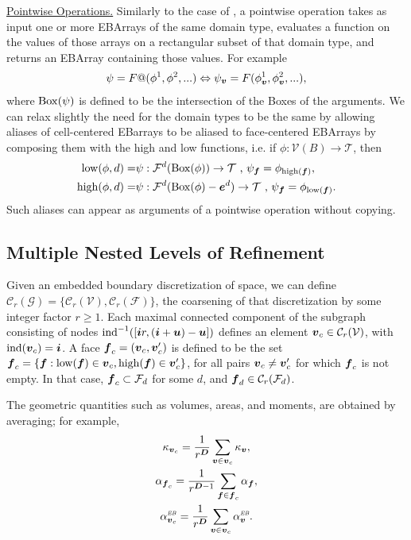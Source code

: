 \documentclass[12pt]{article}
\newcommand{\mcl}[1]{{\mathcal{#1}}}
\newcommand{\ind}{{\rm{ind}}}
\newcommand{\low}{{\rm{low}}}
\newcommand{\high}{{\rm{high}}}
\newcommand{\MBox}{{\rm{Box}}}
\newcommand{\vof}{{\mbf{v}}}
\newcommand{\face}{{\mbf{f}}}
\newcommand{\VC}{{\mcl{C}_r(\mcl{V})}}
\newcommand{\ebsub}{{\text{\it \tiny EB}}}
\begin{document}
\noindent
\underline{Pointwise Operations.} Similarly to the case of , a pointwise operation takes as input one or more EBArrays of the same domain type, evaluates a function on the values of those arrays on a rectangular subset of that domain type, and returns an EBArray containing those values. For example
\begin{gather*}
\psi = F@(\phi^{1},\phi^2, ...) \Leftrightarrow \psi_{\vof} = F(\phi_\vof^1,\phi_\vof^2, ...),
\end{gather*}
where $\MBox(\psi)$ is defined to be the intersection of the Boxes of the arguments.
We can relax slightly the need for the domain types to be the same by allowing aliases of cell-centered EBarrays to be aliased to face-centered EBArrays by composing them with the high and low functions, i.e. if $\phi:\mcl{V}(B) \rightarrow \mcl{T}$, then
\begin{align*}
\low(\phi,d) = & \psi:\mcl{F}^d(\MBox(\phi)) \rightarrow \mcl{T} \cma \psi_\face = \phi_{\high(\face)}, \\ 
\high(\phi,d) = & \psi:\mcl{F}^d(\MBox(\phi)- \mbf{e}^d) \rightarrow \mcl{T} \cma \psi_\face = \phi_{\low(\face)}.
\end{align*}
Such aliases can appear as arguments of a pointwise operation without copying.

\subsection{Multiple Nested Levels of Refinement} 

Given an embedded boundary discretization of space, we can define $\mcl{C}_r(\mcl{G}) =\{ \mcl{C}_r(\mcl{V}),\mcl{C}_r(\mcl{F})\}$, the coarsening of that discretization by some integer factor $r \ge 1$. Each maximal connected component of the subgraph consisting of nodes $\ind^{-1}([\mbf{i} r , (\mbf{i} + \mbf{u}) - \mbf{u}] )$ defines an element $\vof_c \in \VC$, with $\ind(\vof_c) = \mbf{i}$. A face $\face_c = (\vof_c , \vof_c')$ is defined to be the set $\face_c = \{\face: \low(\face ) \in \vof_c , \high(\face) \in \vof_c'\}$, for all pairs $\vof_c \neq \vof_c'$ for which $\face_c$ is not empty. In that case, $\face_c \subset \mcl{F}_d$ for some $d$, and $\face_d \in \mcl{C}_r(\mcl{F}_d)$.

The geometric quantities such as volumes, areas, and moments, are obtained by averaging; for example,
\begin{gather*}
\kappa_{\vof_c} = \frac{1}{r^\DIM} \sum \limits_{\vof \in \vof_c} \kappa_\vof,
\\
\alpha_{\face_c} = \frac{1}{r^{\DIM-1}} \sum \limits_{\face \in \face_c} \alpha_\face,
\\
\alpha_{\vof_c}^\ebsub = \frac{1}{r^\DIM} \sum \limits_{\vof \in \vof_c} \alpha_\vof^\ebsub.
\end{gather*}
\end{document}
